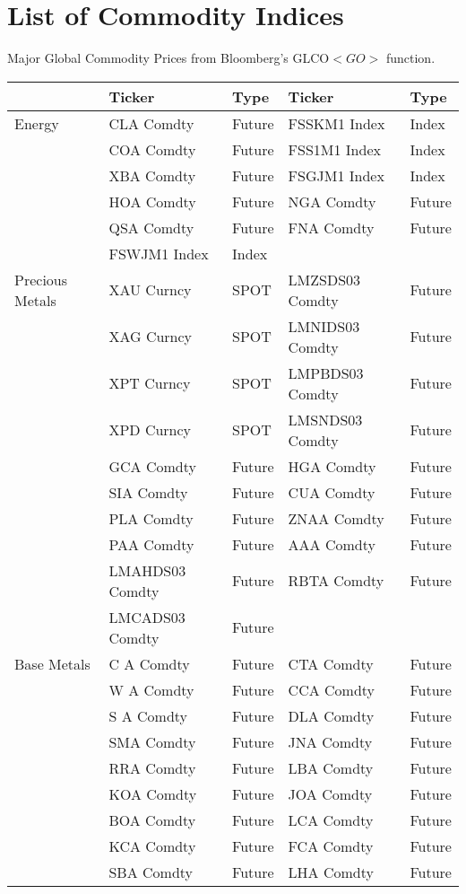\chapter{List of Commodity Indices}\label{sec.E} 
Major Global Commodity Prices from Bloomberg's GLCO$<GO>$ function\cite{bloomberg}.

\begin {table}[H]
\begin{center}
\small
\begin{tabu}{| l | l l | l l |} 
\hline
{} & Ticker & Type & Ticker & Type\\
\hline
Energy & CLA Comdty & Future & FSSKM1 Index & Index \\
 & COA Comdty & Future & FSS1M1 Index & Index \\
 & XBA Comdty & Future & FSGJM1 Index & Index \\
 & HOA Comdty & Future & NGA Comdty & Future \\
 & QSA Comdty & Future & FNA Comdty & Future \\
 & FSWJM1 Index & Index &  &  \\
\hline
Precious Metals & XAU Curncy & SPOT & LMZSDS03 Comdty & Future \\
 & XAG Curncy & SPOT & LMNIDS03 Comdty & Future \\
 & XPT Curncy & SPOT & LMPBDS03 Comdty & Future \\
 & XPD Curncy & SPOT & LMSNDS03 Comdty & Future \\
 & GCA Comdty & Future & HGA Comdty & Future \\
 & SIA Comdty & Future & CUA Comdty & Future \\
 & PLA Comdty & Future & ZNAA Comdty & Future \\
 & PAA Comdty & Future & AAA Comdty & Future \\
 & LMAHDS03 Comdty & Future & RBTA Comdty & Future \\
 & LMCADS03 Comdty & Future &  &  \\
\hline
Base Metals & C A Comdty & Future & CTA Comdty & Future \\
 & W A Comdty & Future & CCA Comdty & Future \\
 & S A Comdty & Future & DLA Comdty & Future \\
 & SMA Comdty & Future & JNA Comdty & Future \\
 & RRA Comdty & Future & LBA Comdty & Future \\
 & KOA Comdty & Future & JOA Comdty & Future \\
 & BOA Comdty & Future & LCA Comdty & Future \\
 & KCA Comdty & Future & FCA Comdty & Future \\
 & SBA Comdty & Future & LHA Comdty & Future \\

\hline
\end{tabu}
\small
\end{center}
\end{table}

